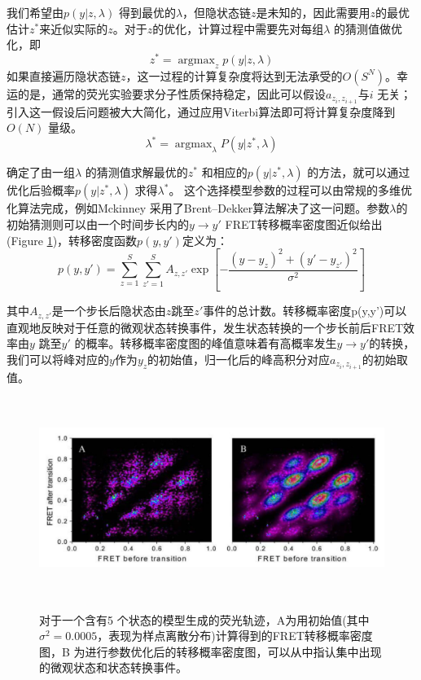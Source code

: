 \documentclass[11pt, a4paper]{article}
\DeclareMathOperator*{\argmax}{argmax}
\begin{document}
我们希望由$p(y|z,\lambda)$ 得到最优的$\lambda$，但隐状态链$z$是未知的，因此需要用$z$的最优估计$z^*$来近似实际的$z$。对于$z$的优化，计算过程中需要先对每组$\lambda$ 的猜测值做优化，即
\begin{equation}\label{eqn:z_opt}
  z^*=\argmax_z p(y|z, \lambda)
\end{equation}
如果直接遍历隐状态链$z$，这一过程的计算复杂度将达到无法承受的$O(S^N)$。幸运的是，通常的荧光实验要求分子性质保持稳定，因此可以假设$a_{z_{i}, z_{i+1}}$与$i$ 无关；引入这一假设后问题被大大简化，通过应用Viterbi算法即可将计算复杂度降到$O(N)$ 量级。
\begin{equation}
\lambda^*=\argmax_{\lambda} P(y|z^*,\lambda)
\end{equation}

确定了由一组$\lambda$ 的猜测值求解最优的$z^*$ 和相应的$p(y|z^*,\lambda)$ 的方法，就可以通过优化后验概率$p(y|z^*,\lambda)$ 求得$\lambda^*$。 这个选择模型参数的过程可以由常规的多维优化算法完成，例如Mckinney 采用了Brent–Dekker算法解决了这一问题\cite{Brent}。参数$\lambda$的初始猜测则可以由一个时间步长内的$y\rightarrow y'$ FRET转移概率密度图近似给出(Figure \ref{fig:tdp})，转移密度函数$p(y,y')$定义为：
\begin{equation}
p(y,y')=\sum_{z=1}^S \sum_{z'=1}^S A_{z, z'} \exp\left[-\frac{(y- y_{z})^2+(y'- y_{z'})^2}{\sigma^2}\right]
\end{equation}

其中$A_{z,z'}$是一个步长后隐状态由$z$跳至$z'$事件的总计数。转移概率密度p(y,y')可以直观地反映对于任意的微观状态转换事件，发生状态转换的一个步长前后FRET效率由$y$ 跳至$y'$ 的概率。转移概率密度图的峰值意味着有高概率发生$y\rightarrow y'$的转换，我们可以将峰对应的$y$作为$y_z$的初始值，归一化后的峰高积分对应$a_{z_{i}, z_{i+1}}$的初始取值。

\begin{figure}[htb]
  \centering
  \includegraphics[height=6.5cm]{Fig_tdp.PNG}\\
  \caption{对于一个含有5 个状态的模型生成的荧光轨迹，A为用初始值(其中$\sigma^2=0.0005$，表现为样点离散分布)计算得到的FRET转移概率密度图，B 为进行参数优化后的转移概率密度图，可以从中指认集中出现的微观状态和状态转换事件。}
  \label{fig:tdp}
\end{figure}
\end{document}
